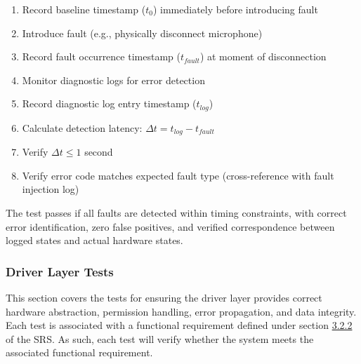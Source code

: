 \documentclass[12pt, titlepage]{article}
\begin{document}
\begin{enumerate}
\begin{enumerate}
\item Record baseline timestamp ($t_0$) immediately before introducing fault
\item Introduce fault (e.g., physically disconnect microphone)
\item Record fault occurrence timestamp ($t_{fault}$) at moment of disconnection
\item Monitor diagnostic logs for error detection
\item Record diagnostic log entry timestamp ($t_{log}$)
\item Calculate detection latency: $\Delta t = t_{log} - t_{fault}$
\item Verify $\Delta t \leq 1$ second
\item Verify error code matches expected fault type (cross-reference with fault
injection log)
\end{enumerate}

The test passes if all faults are detected within timing constraints, with
correct error identification, zero false positives, and verified correspondence
between logged states and actual hardware states.

\end{enumerate}

\subsubsection{Driver Layer Tests}

This section covers the tests for ensuring the driver layer provides correct
hardware abstraction, permission handling, error propagation, and data
integrity. Each test is associated with a functional requirement defined under
section \hyperref[SRS-sec:FR2]{3.2.2} of the SRS. As such, each test will verify
whether the system meets the associated functional requirement.
\end{document}
